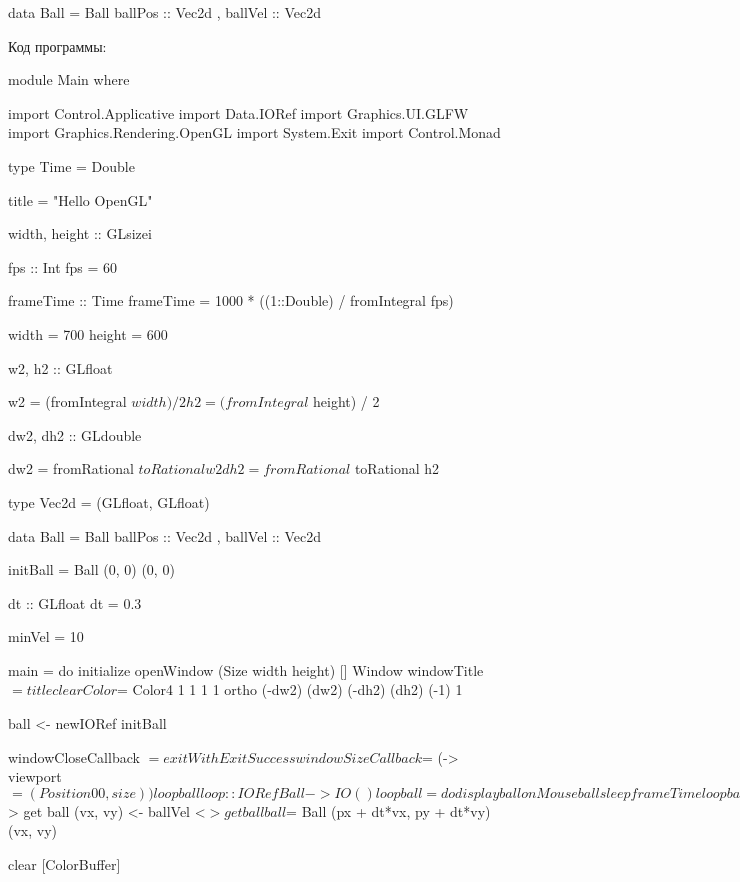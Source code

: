 \begin{code}
data Ball = Ball
    { ballPos :: Vec2d
    , ballVel :: Vec2d
    }
\end{code}

Код программы:

\begin{code}
module Main where

import Control.Applicative
import Data.IORef
import Graphics.UI.GLFW
import Graphics.Rendering.OpenGL
import System.Exit
import Control.Monad

type Time = Double

title = "Hello OpenGL"

width, height :: GLsizei

fps :: Int
fps = 60

frameTime :: Time
frameTime = 1000 * ((1::Double) / fromIntegral fps)

width   = 700
height  = 600
    
w2, h2 :: GLfloat

w2 = (fromIntegral $ width) / 2
h2 = (fromIntegral $ height)  / 2

dw2, dh2 :: GLdouble

dw2 = fromRational $ toRational w2
dh2 = fromRational $ toRational h2

type Vec2d = (GLfloat, GLfloat)

data Ball = Ball
    { ballPos :: Vec2d
    , ballVel :: Vec2d
    }

initBall = Ball (0, 0) (0, 0)

dt :: GLfloat
dt = 0.3

minVel = 10

main = do
    initialize
    openWindow (Size width height) [] Window
    windowTitle $= title

    clearColor $= Color4 1 1 1 1
    ortho (-dw2) (dw2) (-dh2) (dh2) (-1) 1
    
    ball <- newIORef initBall

    windowCloseCallback $= exitWith ExitSuccess
    windowSizeCallback  $= (\size -> viewport $= (Position 0 0, size))

    loop ball

loop :: IORef Ball -> IO ()
loop ball = do    
    display ball
    onMouse ball
    sleep frameTime
    loop ball

display ball = do
    (px, py) <- ballPos <$> get ball
    (vx, vy) <- ballVel <$> get ball
    ball $= Ball (px + dt*vx, py + dt*vy) (vx, vy)

    clear [ColorBuffer]


\end{code}
